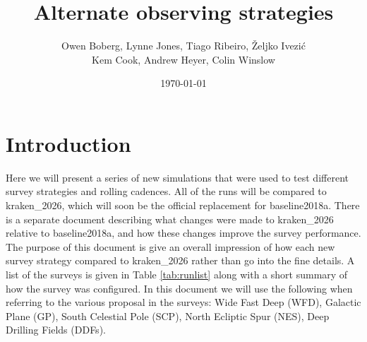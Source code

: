 \documentclass[DM,authoryear,toc]{lsstdoc}
\title{Alternate observing strategies}
\author{%
Owen Boberg,
Lynne Jones,
Tiago Ribeiro,
\v{Z}eljko Ivezi\'{c} \\
Kem Cook, Andrew Heyer,
Colin Winslow}
\date{\today}
\begin{document}
\maketitle

\section{Introduction}

Here we will present a series of new simulations that were used to test different survey strategies and rolling cadences.
All of the runs will be compared to kraken\_2026, which will soon be the official replacement for baseline2018a. There is
a separate document describing what changes were made to kraken\_2026 relative to baseline2018a, and how these changes
improve the survey performance. The purpose of this document is give an overall impression of how each new survey strategy
compared to kraken\_2026 rather than go into the fine details. A list of the surveys is given in Table \ref{tab:runlist} along with
a short summary of how the survey was configured. In this document we will use the following when referring to the various
proposal in the surveys: Wide Fast Deep (WFD), Galactic Plane (GP), South Celestial Pole (SCP), North Ecliptic Spur (NES),
Deep Drilling Fields (DDFs).
\end{document}
